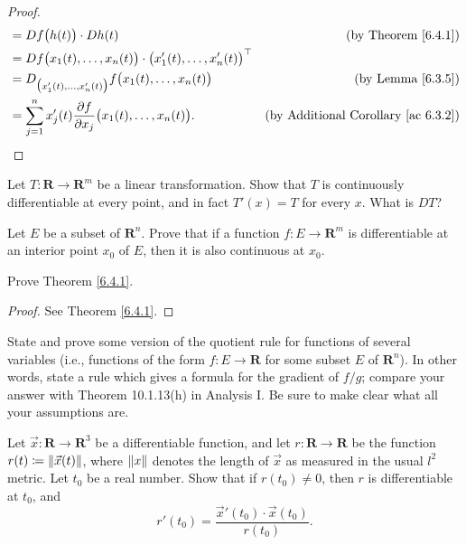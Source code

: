\begin{proof}
\begin{align*}
                                   & = D f\big(h(t)\big) \cdot D h(t)                                                         & \text{(by Theorem \ref{6.4.1})}                 \\
                                   & = D f\big(x_1(t), \dots, x_n(t)\big) \cdot \big(x_1'(t), \dots, x_n'(t)\big)^\top                                                          \\
                                   & = D_{\big(x_1'(t), \dots, x_n'(t)\big)} f\big(x_1(t), \dots, x_n(t)\big)                 & \text{(by Lemma \ref{6.3.5})}                   \\
                                   & = \sum_{j = 1}^n x_j'(t) \frac{\partial f}{\partial x_j}\big(x_1(t), \dots, x_n(t)\big). & \text{(by Additional Corollary \ref{ac 6.3.2})}
    \end{align*}
\end{proof}

\exercisesection

\begin{exercise}\label{ex 6.4.1}
    Let \(T : \mathbf{R} \to \mathbf{R}^m\) be a linear transformation.
    Show that \(T\) is continuously differentiable at every point, and in fact \(T'(x) = T\) for every \(x\).
    What is \(D T\)?
\end{exercise}

\begin{exercise}\label{ex 6.4.2}
    Let \(E\) be a subset of \(\mathbf{R}^n\).
    Prove that if a function \(f : E \to \mathbf{R}^m\) is differentiable at an interior point \(x_0\) of \(E\), then it is also continuous at \(x_0\).
\end{exercise}

\begin{exercise}\label{ex 6.4.3}
    Prove Theorem \ref{6.4.1}.
\end{exercise}

\begin{proof}
    See Theorem \ref{6.4.1}.
\end{proof}

\begin{exercise}\label{ex 6.4.4}
    State and prove some version of the quotient rule for functions of several variables (i.e., functions of the form \(f : E \to \mathbf{R}\) for some subset \(E\) of \(\mathbf{R}^n\)).
    In other words, state a rule which gives a formula for the gradient of \(f / g\);
    compare your answer with Theorem 10.1.13(h) in Analysis I.
    Be sure to make clear what all your assumptions are.
\end{exercise}

\begin{exercise}\label{ex 6.4.5}
    Let \(\vec{x} : \mathbf{R} \to \mathbf{R}^3\) be a differentiable function, and let \(r : \mathbf{R} \to \mathbf{R}\) be the function \(r(t) \coloneqq \norm*{\vec{x}(t)}\), where \(\norm*{x}\) denotes the length of \(\vec{x}\) as measured in the usual \(l^2\) metric.
    Let \(t_0\) be a real number.
    Show that if \(r(t_0) \neq 0\), then \(r\) is differentiable at \(t_0\), and
    \[
        r'(t_0) = \frac{\vec{x}'(t_0) \cdot \vec{x}(t_0)}{r(t_0)}.
    \]
\end{exercise}